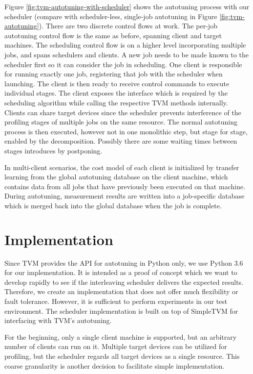 Figure \ref{fig:tvm-autotuning-with-scheduler} shows the autotuning process with our scheduler (compare with scheduler-less, single-job autotuning in Figure \ref{fig:tvm-autotuning}). There are two discrete control flows at work. The per-job autotuning control flow is the same as before, spanning client and target machines. The scheduling control flow is on a higher level incorporating multiple jobs, and spans schedulers and clients. A new job needs to be made known to the scheduler first so it can consider the job in scheduling. One client is responsible for running exactly one job, registering that job with the scheduler when launching. The client is then ready to receive control commands to execute individual stages. The client exposes the interface which is required by the scheduling algorithm while calling the respective TVM methods internally. Clients can share target devices since the scheduler prevents interference of the profiling stages of multiple jobs on the same resource. The normal autotuning process is then executed, however not in one monolithic step, but stage for stage, enabled by the decomposition. Possibly there are some waiting times between stages introduces by postponing.

In multi-client scenarios, the cost model of each client is initialized by transfer learning from the global autotuning database on the client machine, which contains data from all jobs that have previously been executed on that machine. During autotuning, measurement results are written into a job-specific database which is merged back into the global database when the job is complete.

\section{Implementation}
Since TVM provides the API for autotuning in Python only, we use Python 3.6 for our implementation. It is intended as a proof of concept which we want to develop rapidly to see if the interleaving scheduler delivers the expected results. Therefore, we create an implementation that does not offer much flexibility or fault tolerance. However, it is sufficient to perform experiments in our test environment. The scheduler implementation is built on top of SimpleTVM for interfacing with TVM's autotuning.

For the beginning, only a single client machine is supported, but an arbitrary number of clients can run on it. Multiple target devices can be utilized for profiling, but the scheduler regards all target devices as a single resource. This coarse granularity is another decision to facilitate simple implementation.

